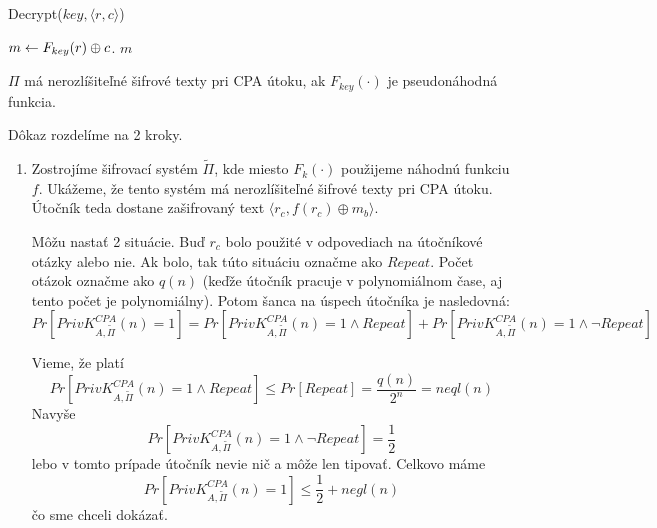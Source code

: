 \begin{procedure}[h!]
    \caption{Decrypt($key,\langle r,c\rangle$)}
    $m \leftarrow F_{key}(r) \oplus c$.
    \Return $m$\;
\end{procedure}

\begin{veta}
$\Pi$ má nerozlíšiteľné šifrové texty pri CPA útoku, ak $F_{key}(\cdot)$ 
je pseudonáhodná funkcia.
\end{veta}

\begin{dokaz}
    Dôkaz rozdelíme na 2 kroky.

    \begin{enumerate}
    \item Zostrojíme šifrovací systém $\tilde{\Pi}$, 
        kde miesto $F_k(\cdot)$ použijeme náhodnú funkciu $f$.
        Ukážeme, že tento systém má nerozlíšiteľné šifrové texty pri CPA útoku.
        Útočník teda dostane zašifrovaný text 
        $\langle r_c, f(r_c) \oplus m_b \rangle$.

        Môžu nastať 2 situácie. Buď $r_c$ bolo použité v odpovediach 
        na útočníkové otázky alebo nie. Ak bolo, tak túto situáciu
        označme ako $Repeat$. Počet otázok označme ako $q(n)$ 
        (keďže útočník pracuje v polynomiálnom čase, 
        aj tento počet je polynomiálny). 
        Potom šanca na úspech útočníka je nasledovná:
        \begin{equation*}
            Pr[PrivK_{A,\tilde{\Pi}}^{CPA}(n)=1] = 
                Pr[PrivK_{A,\tilde{\Pi}}^{CPA}(n)=1\land Repeat]  + 
                Pr[PrivK_{A,\tilde{\Pi}}^{CPA}(n)=1 \land \neg Repeat]
        \end{equation*}

        Vieme, že platí
        \begin{equation*}
            Pr[PrivK_{A,\tilde{\Pi}}^{CPA}(n)=1\land Repeat] \leq 
            Pr[Repeat] = \frac{q(n)}{2^n} = neql(n)
        \end{equation*}
        Navyše
        \begin{equation*}
            Pr[PrivK_{A,\tilde{\Pi}}^{CPA}(n)=1\land \neg Repeat] = 
                \frac{1}{2}
        \end{equation*}
        lebo v tomto prípade útočník nevie nič a môže len tipovať.
        Celkovo máme
        \begin{equation*}
            Pr[PrivK_{A,\tilde{\Pi}}^{CPA}(n)=1] \leq \frac{1}{2} + negl(n)
        \end{equation*}
        čo sme chceli dokázať.


\end{enumerate}
\end{dokaz}
